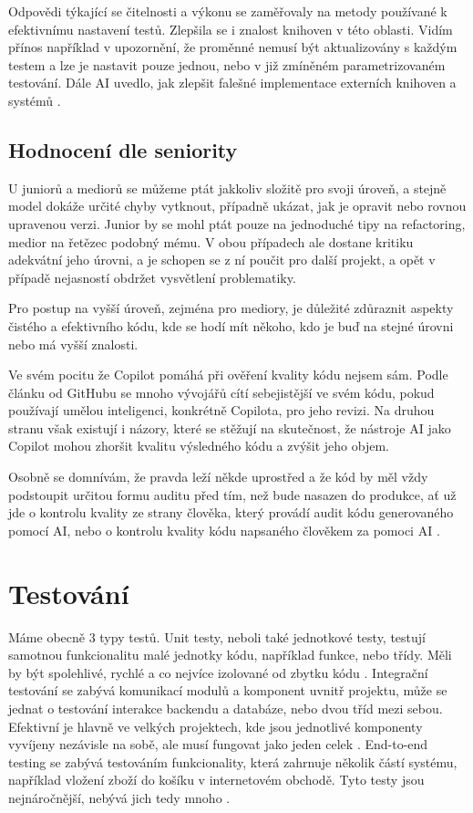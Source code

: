 \documentclass[FM,DP]{tulthesis}
\begin{document}
		Odpovědi týkající se čitelnosti a výkonu se zaměřovaly na metody používané k efektivnímu nastavení testů. Zlepšila se i znalost knihoven v této oblasti. Vidím přínos například v upozornění, že proměnné nemusí být aktualizovány s každým testem a lze je nastavit pouze jednou, nebo v již zmíněném parametrizovaném testování. Dále AI uvedlo, jak zlepšit falešné implementace externích knihoven a systémů \cite{parametrized_testing_fe} \cite{testing}.
		
		
		\subsection{Hodnocení dle seniority}
		U juniorů a mediorů se můžeme ptát jakkoliv složitě pro svoji úroveň, a stejně model dokáže určité chyby vytknout, případně ukázat, jak je opravit nebo rovnou upravenou verzi. Junior by se mohl ptát pouze na jednoduché tipy na refactoring, medior na řetězec podobný mému. V obou případech ale dostane kritiku adekvátní jeho úrovni, a je schopen se z ní poučit pro další projekt, a opět v případě nejasností obdržet vysvětlení problematiky. 
		
		Pro postup na vyšší úroveň, zejména pro mediory, je důležité zdůraznit aspekty čistého a efektivního kódu, kde se hodí mít někoho, kdo je buď na stejné úrovni nebo má vyšší znalosti.
		
		Ve svém pocitu že Copilot pomáhá při ověření kvality kódu nejsem sám. Podle článku od GitHubu se mnoho vývojářů cítí sebejistější ve svém kódu, pokud používají umělou inteligenci, konkrétně Copilota, pro jeho revizi. Na druhou stranu však existují i názory, které se stěžují na skutečnost, že nástroje AI jako Copilot mohou zhoršit kvalitu výsledného kódu a zvýšit jeho objem. 
		
		Osobně se domnívám, že pravda leží někde uprostřed a že kód by měl vždy podstoupit určitou formu auditu před tím, než bude nasazen do produkce, ať už jde o kontrolu kvality ze strany člověka, který provádí audit kódu generovaného pomocí AI, nebo o kontrolu kvality kódu napsaného člověkem za pomoci AI \cite{copilot:code_churn} \cite{copilot:benefits}.
		
		
		\section{Testování}
		Máme obecně 3 typy testů. Unit testy, neboli také jednotkové testy, testují samotnou funkcionalitu malé jednotky kódu, například funkce, nebo třídy. Měli by být spolehlivé, rychlé a co nejvíce izolované od zbytku kódu \cite{testing}. Integrační testování se zabývá komunikací modulů a komponent uvnitř projektu, může se jednat o testování interakce backendu a databáze, nebo dvou tříd mezi sebou. Efektivní je hlavně ve velkých projektech, kde jsou jednotlivé komponenty vyvíjeny nezávisle na sobě, ale musí fungovat jako jeden celek \cite{testing}. End-to-end testing se zabývá testováním funkcionality, která zahrnuje několik částí systému, například vložení zboží do košíku v internetovém obchodě. Tyto testy jsou nejnáročnější, nebývá jich tedy mnoho \cite{testing}.
		
\end{document}
